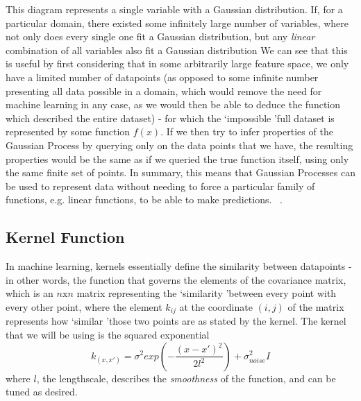 \documentclass[journal]{IEEEtran}
\begin{document}
    This diagram represents a single variable with a Gaussian distribution. If, for a particular domain, there existed some infinitely large number of variables, where not only does every single one fit a Gaussian distribution, but any \textit{linear} combination of all variables also fit a Gaussian distribution We can see that this is useful by first considering that in some arbitrarily large feature space, we only have a limited number of datapoints (as opposed to some infinite number presenting all data possible in a domain, which would remove the need for machine learning in any case, as we would then be able to deduce the function which described the entire dataset) - for which the \lq impossible \rq full dataset is represented by some function $f(x)$. If we then try to infer properties of the Gaussian Process by querying only on the data points that we have, the resulting properties would be the same as if we queried the true function itself, using only the same finite set of points. In summary, this means that Gaussian Processes can be used to represent data without needing to force a particular family of functions, e.g. linear functions, to be able to make predictions. ~\citep{rasmussen06}.

    \subsection{Kernel Function} In machine learning, kernels essentially define the similarity between datapoints - in other words, the function that governs the elements of the covariance matrix, which is an $n \textrm{x} n$ matrix representing the \lq similarity \rq between every point with every other point, where the element $k_{ij}$ at the coordinate $(i,j)$ of the matrix represents how \lq similar \rq those two points are as stated by the kernel. The kernel that we will be using is the squared exponential $$ k_{(x, x')} = \sigma^2 exp\left(-\frac{(x-x')^2}{2l^2}\right) + \sigma^2_{noise}I$$ where $l$, the lengthscale, describes the \textit{smoothness} of the function, and can be tuned as desired.
\end{document}
